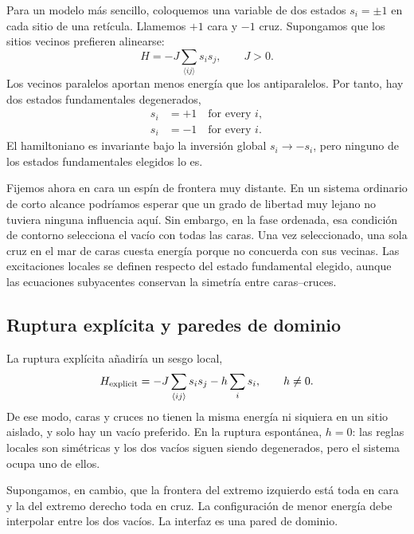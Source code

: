 Para un modelo más sencillo, coloquemos una variable de dos estados \(s_i=\pm1\) en cada sitio de una
retícula. Llamemos \(+1\) cara y \(-1\) cruz. Supongamos que los sitios vecinos prefieren
alinearse:
\begin{equation}
  H=-J\sum_{\langle ij\rangle}s_i s_j,
  \qquad J>0.
\end{equation}
Los vecinos paralelos aportan menos energía que los antiparalelos.
Por tanto, hay dos estados fundamentales degenerados,
\begin{equation}
\begin{aligned}
  s_i&=+1\quad\text{for every }i,
  \\
  s_i&=-1\quad\text{for every }i.
\end{aligned}
\end{equation}
El hamiltoniano es invariante bajo la inversión global \(s_i\to-s_i\), pero ninguno de los estados fundamentales elegidos lo es.

Fijemos ahora en cara un espín de frontera muy distante. En un sistema ordinario de
corto alcance podríamos esperar que un grado de libertad muy lejano no tuviera
ninguna influencia aquí. Sin embargo, en la fase ordenada, esa condición de contorno
selecciona el vacío con todas las caras. Una vez seleccionado, una sola cruz en el
mar de caras cuesta energía porque no concuerda con sus vecinas. Las excitaciones
locales se definen respecto del estado fundamental elegido, aunque las ecuaciones
subyacentes conservan la simetría entre caras--cruces.

\subsection{Ruptura explícita y paredes de dominio}

La ruptura explícita añadiría un sesgo local,
\begin{equation}
  H_{\rm explicit}
  =-J\sum_{\langle ij\rangle}s_i s_j-h\sum_i s_i,
  \qquad h\ne0.
\end{equation}
De ese modo, caras y cruces no tienen la misma energía ni siquiera en un sitio aislado,
y solo hay un vacío preferido. En la ruptura espontánea, \(h=0\): las reglas locales
son simétricas y los dos vacíos siguen siendo degenerados, pero el sistema
ocupa uno de ellos.

Supongamos, en cambio, que la frontera del extremo izquierdo está toda en cara y la
del extremo derecho toda en cruz. La configuración de menor energía debe interpolar
entre los dos vacíos. La interfaz es una pared de dominio.

